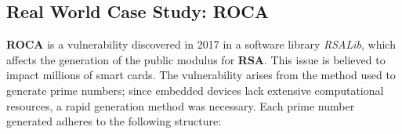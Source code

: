 \documentclass[a4paper,12pt]{report}
\begin{document}
% 
% 
% 
% 
% 
% 
% 
% 
% 
% 
% 

\subsection{Real World Case Study: ROCA}

\textbf{ROCA}\cite{roca} is a vulnerability discovered in 2017 in a software library \textit{RSALib}, which affects the generation of the public modulus for \textbf{RSA}. This issue is believed to impact millions of smart cards. The vulnerability arises from the method used to generate prime numbers; since embedded devices lack extensive computational resources, a rapid generation method was necessary. Each prime number generated adheres to the following structure:
\end{document}
